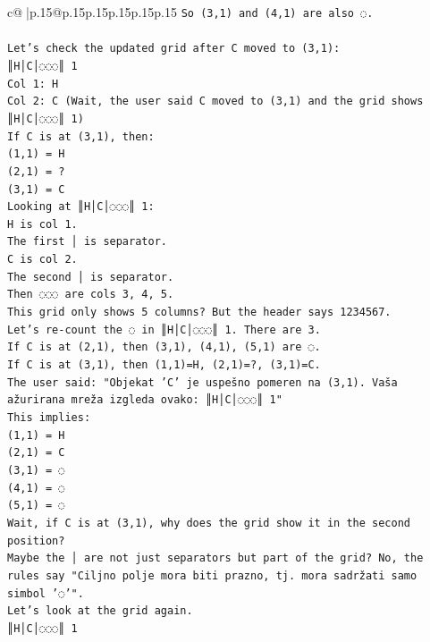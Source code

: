 \documentclass{article}
\begin{document}
{\begin{supertabular}{c@{$\;$}|p{.15\linewidth}@{}p{.15\linewidth}p{.15\linewidth}p{.15\linewidth}p{.15\linewidth}p{.15\linewidth}}
{{{\texttt{So (3,1) and (4,1) are also ◌.} \\
\\ 
\texttt{Let's check the updated grid after C moved to (3,1):} \\
\texttt{║H│C│◌◌◌║ 1} \\
\texttt{Col 1: H} \\
\texttt{Col 2: C (Wait, the user said C moved to (3,1) and the grid shows ║H│C│◌◌◌║ 1)} \\
\texttt{If C is at (3,1), then:} \\
\texttt{(1,1) = H} \\
\texttt{(2,1) = ?} \\
\texttt{(3,1) = C} \\
\texttt{Looking at ║H│C│◌◌◌║ 1:} \\
\texttt{H is col 1.} \\
\texttt{The first │ is separator.} \\
\texttt{C is col 2.} \\
\texttt{The second │ is separator.} \\
\texttt{Then ◌◌◌ are cols 3, 4, 5.} \\
\texttt{This grid only shows 5 columns? But the header says 1234567.} \\
\texttt{Let's re{-}count the ◌ in ║H│C│◌◌◌║ 1. There are 3.} \\
\texttt{If C is at (2,1), then (3,1), (4,1), (5,1) are ◌.} \\
\texttt{If C is at (3,1), then (1,1)=H, (2,1)=?, (3,1)=C.} \\
\texttt{The user said: "Objekat 'C' je uspešno pomeren na (3,1). Vaša ažurirana mreža izgleda ovako: ║H│C│◌◌◌║ 1"} \\
\texttt{This implies:} \\
\texttt{(1,1) = H} \\
\texttt{(2,1) = C} \\
\texttt{(3,1) = ◌} \\
\texttt{(4,1) = ◌} \\
\texttt{(5,1) = ◌} \\
\texttt{Wait, if C is at (3,1), why does the grid show it in the second position?} \\
\texttt{Maybe the │ are not just separators but part of the grid? No, the rules say "Ciljno polje mora biti prazno, tj. mora sadržati samo simbol '◌'".} \\
\texttt{Let's look at the grid again.} \\
\texttt{║H│C│◌◌◌║ 1} \\
}}}
\end{supertabular}}
\end{document}
